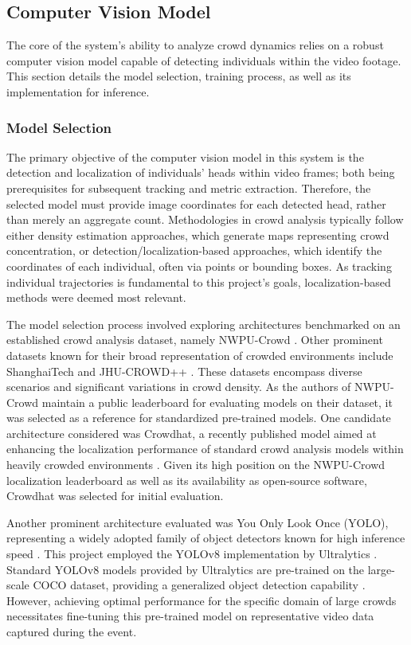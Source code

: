 \subsection{Computer Vision Model}
\label{sec:cv_model}

The core of the system's ability to analyze crowd dynamics relies on a robust computer vision model capable of detecting individuals within the video footage. This section details the model selection, training process, as well as its implementation for inference.

\subsubsection{Model Selection}

The primary objective of the computer vision model in this system is the detection and localization of individuals' heads within video frames; both being prerequisites for subsequent tracking and metric extraction. Therefore, the selected model must provide image coordinates for each detected head, rather than merely an aggregate count. Methodologies in crowd analysis typically follow either density estimation approaches, which generate maps representing crowd concentration, or detection/localization-based approaches, which identify the coordinates of each individual, often via points or bounding boxes. As tracking individual trajectories is fundamental to this project's goals, localization-based methods were deemed most relevant.

The model selection process involved exploring architectures benchmarked on an established crowd analysis dataset, namely NWPU-Crowd \cite{nwpu}. Other prominent datasets known for their broad representation of crowded environments include ShanghaiTech and JHU-CROWD++ \cite{shanghai_tech} \cite{jhu_crowd}. These datasets encompass diverse scenarios and significant variations in crowd density. As the authors of NWPU-Crowd maintain a public leaderboard for evaluating models on their dataset, it was selected as a reference for standardized pre-trained models. One candidate architecture considered was Crowdhat, a recently published model aimed at enhancing the localization performance of standard crowd analysis models within heavily crowded environments \cite{crowdhat}. Given its high position on the NWPU-Crowd localization leaderboard as well as its availability as open-source software, Crowdhat was selected for initial evaluation.

Another prominent architecture evaluated was You Only Look Once (YOLO), representing a widely adopted family of object detectors known for high inference speed \cite{yolo}. This project employed the YOLOv8 implementation by Ultralytics \cite{ultralytics}. Standard YOLOv8 models provided by Ultralytics are pre-trained on the large-scale COCO dataset, providing a generalized object detection capability \cite{coco}. However, achieving optimal performance for the specific domain of large crowds necessitates fine-tuning this pre-trained model on representative video data captured during the event.

